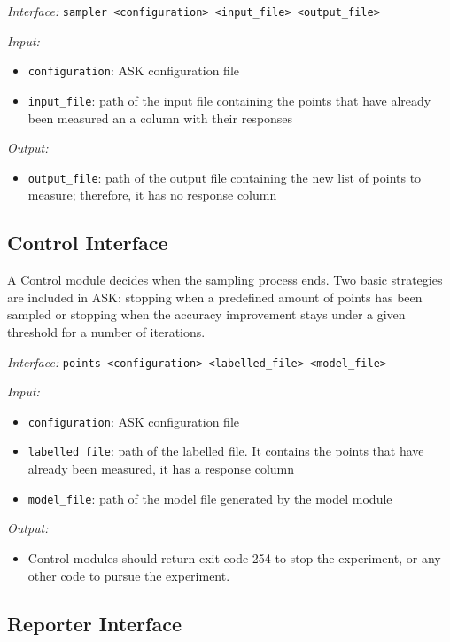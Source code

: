 \emph{Interface:} \texttt{sampler \textless{}configuration\textgreater{} \textless{}input\_file\textgreater{} \textless{}output\_file\textgreater{}} 

\emph{Input:}
\begin{itemize}
	\item \texttt{configuration}: ASK configuration file
	\item \texttt{input\_file}: path of the input file containing the points that have already been measured an a column with their responses
\end{itemize}

\emph{Output:}
\begin{itemize}
	\item \texttt{output\_file}: path of the output file containing the new list of points to measure; therefore, it has no response column
\end{itemize}

\subsection{Control Interface}

A Control module decides when the sampling process ends. Two basic strategies are included in ASK: stopping when a predefined amount of points has been sampled or stopping when the accuracy improvement stays under a given threshold for a number of iterations.

\emph{Interface:} \texttt{points \textless{}configuration\textgreater{} \textless{}labelled\_file\textgreater{} \textless{}model\_file\textgreater{}} 

\emph{Input:}
\begin{itemize}
	\item \texttt{configuration}: ASK configuration file
	\item \texttt{labelled\_file}: path of the labelled file. It contains the points that have already been measured, it has a response column
	\item \texttt{model\_file}: path of the model file generated by the model module
\end{itemize}

\emph{Output:}
\begin{itemize}
	\item Control modules should return exit code 254 to stop the experiment, or any other code to pursue the experiment.
\end{itemize}

\subsection{Reporter Interface}

